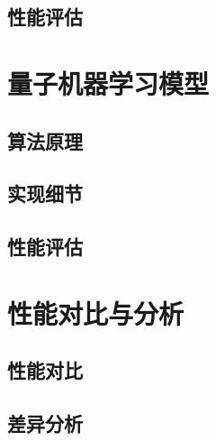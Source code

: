 \documentclass[10pt,a4paper,twoside]{article}
\numberwithin{figure}{section}%
\numberwithin{table}{section}%
\begin{document}
\subsection{性能评估}


\section{量子机器学习模型}

\subsection{算法原理}

\subsection{实现细节}

\subsection{性能评估}


\section{性能对比与分析}

\subsection{性能对比}

\subsection{差异分析}




\end{document}
